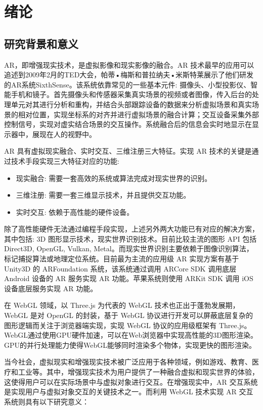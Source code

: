 \section{绪论}
\subsection{研究背景和意义}

AR，即增强现实技术，是虚拟影像和现实影像的融合。AR 技术最早的应用可以追述到2009年2月的TED大会，帕蒂•梅斯和普拉纳夫•米斯特莱展示了他们研发的AR系统SixthSense\cite{SixthSense}。该系统依靠常见的一些基本元件: 摄像头、小型投影仪、智能手机和镜子。首先摄像头和传感器采集真实场景的视频或者图像，传入后台的处理单元对其进行分析和重构，并结合头部跟踪设备的数据来分析虚拟场景和真实场景的相对位置，实现坐标系的对齐并进行虚拟场景的融合计算；交互设备采集外部控制信号，实现对虚实结合场景的交互操作。系统融合后的信息会实时地显示在显示器中，展现在人的视野中\cite{userExperience}。

AR 具有虚拟现实融合、实时交互、三维注册三大特征\cite{nonphysical}。实现 AR 技术的关键是通过技术手段实现三大特征对应的功能:
\begin{itemize}
  \item 现实融合: 需要一套高效的系统或算法完成对现实世界的识别。
  \item 三维注册: 需要一套三维显示技术，并且提供交互功能。
  \item 实时交互: 依赖于高性能的硬件设备。
\end{itemize}

除了高性能硬件无法通过编程手段实现，上述另外两大功能已有对应的解决方案，其中包括: 3D 图形显示技术，现实世界识别技术。目前比较主流的图形 API 包括 Direct3D, OpenGL, Vulkan, Metal\cite{hearn2004computer}。而现实世界识别主要依赖于图像识别算法，标记捕捉算法或地理定位系统。目前最为主流的应用级 AR 实现方案有基于 Unity3D 的 ARFoundation 系统，该系统通过调用 ARCore SDK 调用底层 Android 设备的 AR 服务实现 AR 功能\cite{ARFoundation}。苹果系统则使用 ARKit SDK 调用 iOS 设备底层服务实现 AR 功能。

在 WebGL 领域，以 Three.js 为代表的 WebGL 技术也正出于蓬勃发展期，WebGL 是对 OpenGL 的封装，基于 WebGL 协议进行开发可以屏蔽底层复杂的图形逻辑而关注于浏览器端实现，实现 WebGL 协议的应用级框架有 Three.js。WebGL通过使用GPU硬件加速，可以在Web浏览器中实现高性能的3D图形渲染。GPU的并行处理能力使得WebGL能够同时渲染多个物体，实现更快的图形渲染。

当今社会，虚拟现实和增强现实技术被广泛应用于各种领域，例如游戏、教育、医疗和工业等。其中，增强现实技术为用户提供了一种融合虚拟和现实世界的体验，这使得用户可以在实际场景中与虚拟对象进行交互。在增强现实中，AR 交互系统是实现用户与虚拟对象交互的关键技术之一。而利用 WebGL 技术实现 AR 交互系统则具有以下研究意义：

